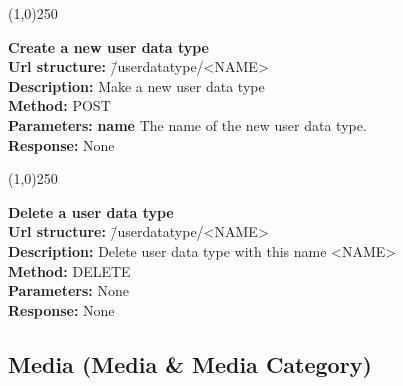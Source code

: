 \documentclass[11pt]{article}
\begin{document}
\begin{center}\line(1,0){250}\end{center}

\begin{tabbing}
\textbf{Create a new user data type} \\
\textcolor{black!60}{\textbf{Url structure:}} \hspace{0.2in} \= /userdatatype/<NAME> \\
\textcolor{black!60}{\textbf{Description:}}  \> Make a new user data type \\
\textcolor{black!60}{\textbf{Method:}} \> POST \\
\textcolor{black!60}{\textbf{Parameters:}} \> \textbf{name} The name of the new user data type. \\
\textcolor{black!60}{\textbf{Response:}} \> None
\end{tabbing}

\begin{center}\line(1,0){250}\end{center}

\begin{tabbing}
\textbf{Delete a user data type} \\
\textcolor{black!60}{\textbf{Url structure:}} \hspace{0.2in} \= /userdatatype/<NAME> \\
\textcolor{black!60}{\textbf{Description:}}  \> Delete user data type with this name <NAME> \\
\textcolor{black!60}{\textbf{Method:}} \> DELETE \\
\textcolor{black!60}{\textbf{Parameters:}} \> None \\
\textcolor{black!60}{\textbf{Response:}} \> None
\end{tabbing}


\subsection{Media (Media \& Media Category)}
\label{sec-1-3}
\end{document}
